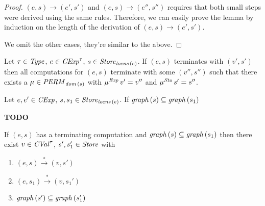 \documentclass[12pt,a4paper]{report}
\newcommand{\CExp}{\nstyle{CExp}}
\newcommand{\CVal}{\nstyle{CVal}}
\newcommand{\Sto}{\nstyle{Sto}}
\newcommand{\PERM}{\nstyle{PERM}}
\begin{document}
\begin{proof}
  $(e,s) \to (e',s')$ and $(e,s) \to (e'',s'')$ requires that both small steps were derived
  using the same rules. Therefore, we can easily prove the lemma by induction on the length
  of the derivation of $(e,s) \to (e',s')$.
  We omit the other cases, they're similar to the above.
\end{proof}

\begin{corollary}
  Let $\tau\in\mathit{Type}$, $e\in\CExp^\tau$, $s\in\mathit{Store}_{\mathit{locns}\,(e)}$.
  If $(e,s)$ terminates with $(v',s')$ then all computations for $(e,s)$ terminate with some
  $(v'',s'')$ such that there exists a $\mu \in \PERM_{\dom{s}}$ with
  $\mu^{\mathit{Exp}}\,v' = v''$ and $\mu^\Sto\,s' = s''$.
\end{corollary}

\begin{lemma}
  Let $e,e' \in \CExp$, $s,s_1\in\mathit{Store}_{\mathit{locns}\,(e)}$. If $\mathit{graph}\,(s) \subseteq \mathit{graph}\,(s_1)$

  {\bf TODO}
\end{lemma}

\begin{corollary}
  If $(e,s)$ has a terminating computation and $\mathit{graph}\,(s) \subseteq \mathit{graph}\,(s_1)$ then
  there exist $v\in\CVal^\tau$, $s',s_1'\in\mathit{Store}$ with
  \begin{enumerate}
    \item $(e,s) \xrightarrow* (v,s')$
    \item $(e,s_1) \xrightarrow* (v,s_1')$
    \item $\mathit{graph}\,(s') \subseteq \mathit{graph}\,(s_1')$
  \end{enumerate}
\end{corollary}
\end{document}
